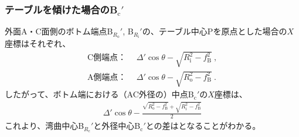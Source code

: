 \clearpage
\subsubsection{テーブルを傾けた場合のB\texorpdfstring{$_\mathrm c'$}{c'}}
外面A・C面側のボトム端点B$_{R_\mathrm o}'$, B$_{R_\mathrm i}'$の、テーブル中心Pを原点とした場合の$X$座標はそれぞれ、
\begin{subequations}
\begin{align}
  \label{eq:tableBRi}
  \text{C側端点：}&~~
  \Delta'\cos\theta-\sqrt{R_\mathrm i^2-f_\mathrm B^2}\ ,\\
  \text{A側端点：}&~~
  \Delta'\cos\theta-\sqrt{R_\mathrm o^2-f_\mathrm B^2}\ .
\end{align}
\end{subequations}
したがって、ボトム端における（AC外径の）中点B$_\mathrm c'$の$X$座標は、
\begin{align}
  \label{eq:tableBc}
  \Delta'\cos\theta-\frac{\sqrt{R_\mathrm o^2-f_\mathrm B^2}+\sqrt{R_\mathrm i^2-f_\mathrm B^2}}2
\end{align}
これより、湾曲中心B$_{R_\mathrm c}'$と外径中心B$_\mathrm c'$との差はとなることがわかる。
\vfill
